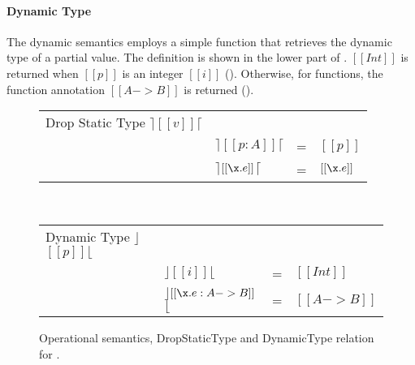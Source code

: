 \paragraph{Dynamic Type}  The dynamic semantics employs a simple
function that retrieves the dynamic type of a partial value. 
The definition
is shown in the lower part of .
$[[Int]]$ is returned when $[[p]]$ is an integer $[[i]]$ ().
Otherwise, for functions, the function annotation $[[A -> B]]$ is returned
().

\begin{figure}[t]
  \begin{small}
    \centering
  \end{small}
  \bigskip
  \begin{center}
  {\renewcommand{\arraystretch}{1.2}
    \begin{tabular}{|llcl|}
      \hline
      Drop Static Type $\rceil$$[[v]]$$\lceil$ &  & & \\
     & $\rceil$$[[p:A]]$$\lceil$ & = & $[[p]]$ \\
     & $\rceil$$[[\x.e]]$$\lceil$ & = & $[[\x.e]]$ \\
      \hline
    \end{tabular} } \\
  \bigskip
  {\renewcommand{\arraystretch}{1.2}
    \begin{tabular}{|llcl|}
      \hline
      Dynamic Type $\rfloor$$[[p]]$$\lfloor$ &  & & \\
     & $\rfloor$$[[i]]$$\lfloor$ & = & $[[Int]]$ \\
     & $\rfloor$$[[\x.e: A -> B]]$$\lfloor$ & = & $[[A -> B]]$ \\
      \hline
    \end{tabular} }
    \end{center}
  \caption{Operational semantics, DropStaticType and DynamicType relation for \cal.}
  \label{fig:union:os}
\end{figure}

